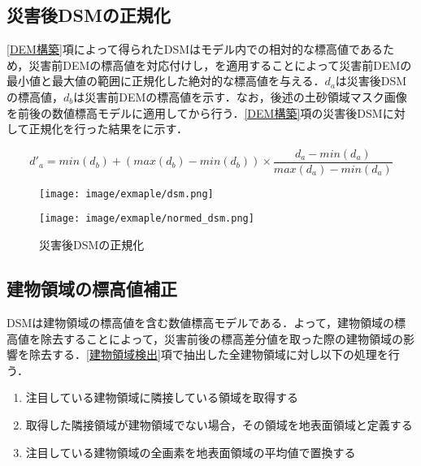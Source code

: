     \subsection{災害後DSMの正規化}
      \label{災害後DSMの正規化}
      \ref{DEM構築}項によって得られたDSMはモデル内での相対的な標高値であるため，災害前DEMの標高値を対応付けし，を適用することによって災害前DEMの最小値と最大値の範囲に正規化した絶対的な標高値を与える．$d_{a}$は災害後DSMの標高値，$d_{b}$は災害前DEMの標高値を示す．なお，後述の土砂領域マスク画像を前後の数値標高モデルに適用してから行う．\ref{DEM構築}項の災害後DSMに対して正規化を行った結果をに示す．

      \begin{equation}
        \label{正規化}
        d'_{a} =  
          min(d_{b}) + (max(d_{b}) - min(d_{b})) \times
          \dfrac{d_{a} - min(d_{a})} {max(d_{a}) - min(d_{a})}
      \end{equation}

      \begin{figure}[tbp]
        \begin{minipage}[c]{0.5\hsize}
          \centering
          \texttt{[image: image/exmaple/dsm.png]}
        \end{minipage}
        \begin{minipage}[c]{0.5\hsize}
          \centering
          \texttt{[image: image/exmaple/normed\_dsm.png]}
        \end{minipage}
        \caption{災害後DSMの正規化}
        \label{災害後DSMの正規化結果}
      \end{figure}


    \subsection{建物領域の標高値補正}
      DSMは建物領域の標高値を含む数値標高モデルである．よって，建物領域の標高値を除去することによって，災害前後の標高差分値を取った際の建物領域の影響を除去する．\ref{建物領域検出}項で抽出した全建物領域に対し以下の処理を行う．

      \begin{enumerate}
        \setlength{\itemsep}{-5pt}
        \item 注目している建物領域に隣接している領域を取得する
        \item 取得した隣接領域が建物領域でない場合，その領域を地表面領域と定義する
        \item 注目している建物領域の全画素を地表面領域の平均値で置換する
      \end{enumerate}

